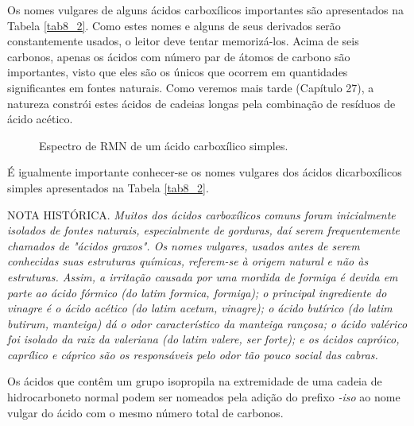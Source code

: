 Os nomes vulgares de alguns ácidos carboxílicos importantes são apresentados na Tabela \ref{tab8_2}. Como estes nomes e alguns de seus derivados serão constantemente usados, o leitor deve tentar memorizá-los. Acima de seis carbonos, apenas os ácidos com número par de átomos de carbono são importantes, visto que eles são os únicos que ocorrem em quantidades significantes em fontes naturais. Como veremos mais tarde (Capítulo 27), a natureza constrói estes ácidos de cadeias longas pela combinação de resíduos de ácido acético.

\begin{figure}[H]
    \centering
    \caption{Espectro de RMN de um ácido carboxílico simples.}
    \label{fig8_5}
\end{figure}

É igualmente importante conhecer-se os nomes vulgares dos ácidos dicarboxílicos simples apresentados na Tabela \ref{tab8_2}.

\par\bigskip
\noindent NOTA HISTÓRICA. \emph{Muitos dos ácidos carboxílicos comuns foram inicialmente isolados de fontes naturais, especialmente de gorduras, daí serem frequentemente chamados de "ácidos graxos". Os nomes vulgares, usados antes de serem conhecidas suas estruturas químicas, referem-se à origem natural e não às estruturas. Assim, a irritação causada por uma mordida de formiga é devida em parte ao ácido fórmico (do latim formica, formiga); o principal ingrediente do vinagre é o ácido acético (do latim acetum, vinagre); o ácido butírico (do latim butirum, manteiga) dá o odor característico da manteiga rançosa; o ácido valérico foi isolado da raiz da valeriana (do latim valere, ser forte); e os ácidos capróico, caprílico e cáprico são os responsáveis pelo odor tão pouco social das cabras.}
\par\bigskip

Os ácidos que contêm um grupo isopropila na extremidade de uma cadeia de hidrocarboneto normal podem ser nomeados pela adição do prefixo \textit{-iso} ao nome vulgar do ácido com o mesmo número total de carbonos.

\begin{tightcenter}
\chemnameinit{}
    \qquad
\end{tightcenter}

